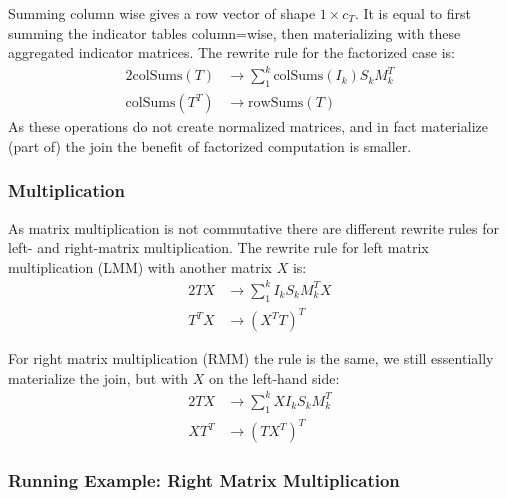 Summing column wise gives a row vector of shape $1 \times c_T$. It is equal to first summing the indicator tables column=wise, then materializing with these aggregated indicator matrices.  The rewrite rule for the factorized case is:
\begin{alignat*}{2}
    \text{colSums}(T)   & \rightarrow \sum_1^k \text{colSums}(I_k) S_k M_k^T \\
    \text{colSums}(T^T) & \rightarrow \text{rowSums}(T)
\end{alignat*}
As these operations do not create normalized matrices, and in fact materialize (part of) the join the benefit of factorized computation is smaller.

\subsubsection{Multiplication}
As matrix multiplication is not commutative there are different rewrite rules for left- and right-matrix multiplication. The rewrite rule for left matrix multiplication (LMM) with another matrix $X$ is:
\begin{alignat*}{2}
    TX   & \rightarrow \sum_1^k I_k S_k M_k^T X \\
    T^TX & \rightarrow (X^TT)^T
\end{alignat*}

For right matrix multiplication (RMM) the rule is the same, we still essentially materialize the join, but with $X$ on the left-hand side:
\begin{alignat*}{2}
    TX   & \rightarrow \sum_1^k X I_k S_k M_k^T \\
    XT^T & \rightarrow (TX^T)^T
\end{alignat*}



\subsubsection{Running Example: Right Matrix Multiplication}

